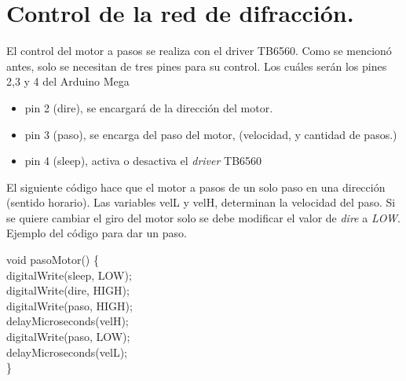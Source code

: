 \section{Control de la red de difracción.}
El control del motor a pasos se realiza con el driver TB6560. Como se mencionó antes, solo se necesitan de tres pines para su control. Los cuáles serán los pines 2,3 y 4 del Arduino Mega
\begin{itemize}
	\item pin 2 (dire), se encargará de la dirección del motor.
	\item pin 3 (paso), se encarga del paso del motor, (velocidad, y cantidad de pasos.)
	\item pin 4 (sleep), activa o desactiva el \textit{driver} TB6560
\end{itemize}
El siguiente código hace que el motor a pasos de un solo paso en una dirección (sentido horario). Las variables velL y velH, determinan la velocidad del paso. Si se quiere cambiar el giro del motor solo se debe modificar el valor de \textit{dire} a \textit{LOW}. Ejemplo del código para dar un paso.
\begin{center}
	void pasoMotor() \{ \\
	digitalWrite(sleep, LOW);\\ 
	digitalWrite(dire, HIGH);\\
	digitalWrite(paso, HIGH);\\
	delayMicroseconds(velH);\\
	digitalWrite(paso, LOW);\\
	delayMicroseconds(velL);\\
	\}
\end{center}


